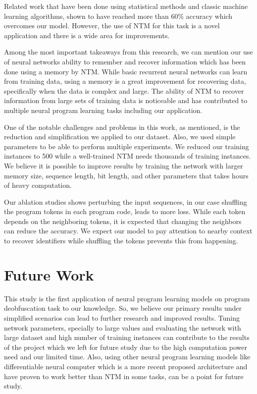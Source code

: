 \documentclass[acmsmall]{acmart}
\begin{document}
Related work that have been done using statistical methods and classic machine learning algorithms, shown to have reached more than 60\% accuracy which overcomes our model. However, the use of NTM for this task is a novel application and there is a wide area for improvements.

Among the most important takeaways from this research, we can mention our use of neural networks ability to remember and recover information which has been done using a memory by NTM. While basic recurrent neural networks can learn from training data, using a memory is a great improvement for recovering data, specifically when the data is complex and large. The ability of NTM to recover information from large sets of training data is noticeable and has contributed to multiple neural program learning tasks including our application.

One of the notable challenges and problems in this work, as mentioned, is the reduction and simplification we applied to our dataset. Also, we used simple parameters to be able to perform multiple experiments. We reduced our training instances to 500 while a well-trained NTM needs thousands of training instances. We believe it is possible to improve results by training the network with larger memory size, sequence length, bit length, and other parameters that takes hours of heavy computation.

Our ablation studies shows perturbing the input sequences, in our case shuffling the program tokens in each program code, leads to more loss. While each token depends on the neighboring tokens, it is expected that changing the neighbors can reduce the accuracy. We expect our model to pay attention to nearby context to recover identifiers while shuffling the tokens prevents this from happening.
\section{Future Work}
This study is the first application of neural program learning models on program deobfuscation task to our knowledge. So, we believe our primary results under simplified scenarios can lead to further research and improved results. Tuning network parameters, specially to large values and evaluating the network with large dataset and high number of training instances can contribute to the results of the project which we left for future study due to the high computation power need and our limited time. Also, using other neural program learning models like differentiable neural computer \cite{dnc} which is a more recent proposed architecture and have proven to work better than NTM in some tasks, can be a point for future study.
\end{document}
